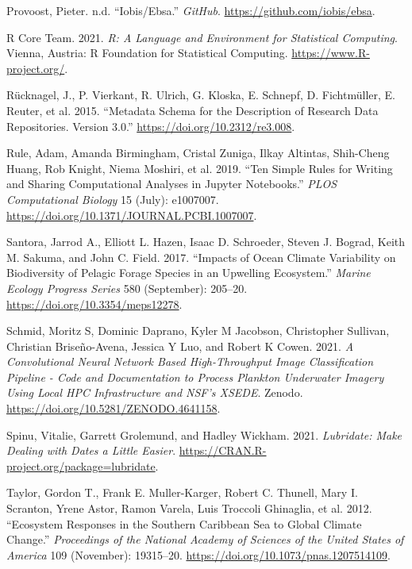 \documentclass[
]{book}
\newlength{\cslhangindent}
\newlength{\cslentryspacingunit} %
\newenvironment{CSLReferences}[2] %
 {%
  \setlength{\parindent}{0pt}
  \ifodd #1
  \let\oldpar\par
  \def\par{\hangindent=\cslhangindent\oldpar}
  \fi
  \setlength{\parskip}{#2\cslentryspacingunit}
 }%
 {}
\begin{document}
\begin{CSLReferences}{1}{0}
\leavevmode{}%
Provoost, Pieter. n.d. {``Iobis/Ebsa.''} \emph{GitHub}. \url{https://github.com/iobis/ebsa}.

\leavevmode{}%
R Core Team. 2021. \emph{R: A Language and Environment for Statistical Computing}. Vienna, Austria: R Foundation for Statistical Computing. \url{https://www.R-project.org/}.

\leavevmode{}%
Rücknagel, J., P. Vierkant, R. Ulrich, G. Kloska, E. Schnepf, D. Fichtmüller, E. Reuter, et al. 2015. {``Metadata Schema for the Description of Research Data Repositories. Version 3.0.''} \url{https://doi.org/10.2312/re3.008}.

\leavevmode{}%
Rule, Adam, Amanda Birmingham, Cristal Zuniga, Ilkay Altintas, Shih-Cheng Huang, Rob Knight, Niema Moshiri, et al. 2019. {``Ten Simple Rules for Writing and Sharing Computational Analyses in Jupyter Notebooks.''} \emph{PLOS Computational Biology} 15 (July): e1007007. \url{https://doi.org/10.1371/JOURNAL.PCBI.1007007}.

\leavevmode{}%
Santora, Jarrod A., Elliott L. Hazen, Isaac D. Schroeder, Steven J. Bograd, Keith M. Sakuma, and John C. Field. 2017. {``Impacts of Ocean Climate Variability on Biodiversity of Pelagic Forage Species in an Upwelling Ecosystem.''} \emph{Marine Ecology Progress Series} 580 (September): 205--20. \url{https://doi.org/10.3354/meps12278}.

\leavevmode{}%
Schmid, Moritz S, Dominic Daprano, Kyler M Jacobson, Christopher Sullivan, Christian Briseño-Avena, Jessica Y Luo, and Robert K Cowen. 2021. \emph{A Convolutional Neural Network Based High-Throughput Image Classification Pipeline - Code and Documentation to Process Plankton Underwater Imagery Using Local HPC Infrastructure and NSF's XSEDE}. Zenodo. \url{https://doi.org/10.5281/ZENODO.4641158}.

\leavevmode{}%
Spinu, Vitalie, Garrett Grolemund, and Hadley Wickham. 2021. \emph{Lubridate: Make Dealing with Dates a Little Easier}. \url{https://CRAN.R-project.org/package=lubridate}.

\leavevmode{}%
Taylor, Gordon T., Frank E. Muller-Karger, Robert C. Thunell, Mary I. Scranton, Yrene Astor, Ramon Varela, Luis Troccoli Ghinaglia, et al. 2012. {``Ecosystem Responses in the Southern Caribbean Sea to Global Climate Change.''} \emph{Proceedings of the National Academy of Sciences of the United States of America} 109 (November): 19315--20. \url{https://doi.org/10.1073/pnas.1207514109}.


\end{CSLReferences}
\end{document}
